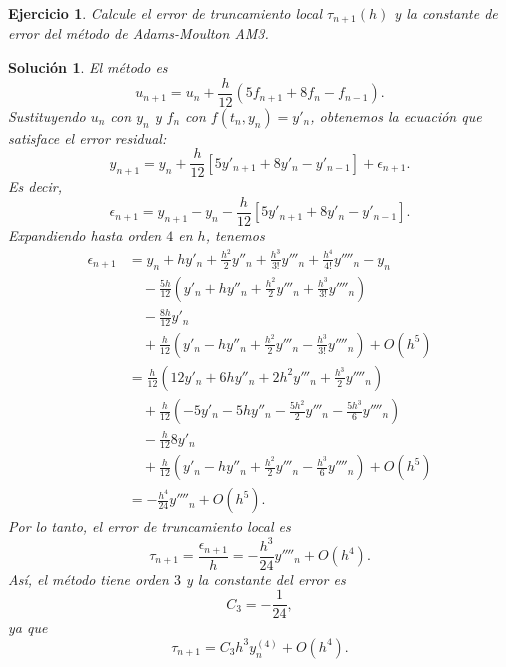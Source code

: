 \documentclass[11pt]{article}
\newtheorem{exercise}{Ejercicio}
\newtheorem*{sol}{Solución}
\begin{document}
\begin{exercise}
  Calcule el error de truncamiento local $\tau_{n+1}(h)$ y la
  constante de error del método de Adams-Moulton AM3.
\end{exercise}
\begin{sol}
  El método es
  \begin{equation}
    u_{n+1} = u_n + \frac{h}{12}(5f_{n+1}+8f_n-f_{n-1})
  .\end{equation}
  Sustituyendo $u_n$ con $y_n$ y $f_n$ con $f(t_n,y_n)=y'_n$,
  obtenemos la ecuación que satisface el error residual:
  \begin{equation}
    y_{n+1}
    = y_n
    + \frac{h}{12}[5y'_{n+1}+8y'_n-y'_{n-1}]
    + \epsilon_{n+1}
  .\end{equation}
  Es decir,
  \begin{equation}
    \epsilon_{n+1}
    = y_{n+1}
    - y_n
    - \frac{h}{12}[5y'_{n+1}+8y'_n-y'_{n-1}]
  .\end{equation}
  Expandiendo hasta orden $4$ en $h$, tenemos
  \begin{align}
    \epsilon_{n+1}
    &= y_n + hy'_n
      + \frac{h^{2}}{2}y''_n
      + \frac{h^{3}}{3!}y'''_n
      + \frac{h^{4}}{4!} y''''_n
      - y_n
    \\
    &\quad
      - \frac{5h}{12}
      \left(
        y'_{n}+hy''_n
        + \frac{h^{2}}{2}y'''_n
        + \frac{h^{3}}{3!}y''''_n
      \right) \\
    &\quad - \frac{8h}{12}y'_n \\
    &\quad
      + \frac{h}{12}
      \left(
        y'_{n}
        - hy''_n
        + \frac{h^{2}}{2}y'''_n
        - \frac{h^{3}}{3!}y''''_n
      \right)
      + O(h^{5})
    \\
    &= \frac{h}{12}
      \left(
        12y'_n
        + 6hy''_n
        + 2h^{2}y'''_n
        + \frac{h^{3}}{2} y''''_n
      \right)
    \\
    &\quad
      + \frac{h}{12}
      \left(
        - 5y'_{n}
        - 5hy''_n
        - \frac{5h^{2}}{2}y'''_n
        - \frac{5h^{3}}{6}y''''_n
      \right) \\
    &\quad
      - \frac{h}{12}8y'_n \\
    &\quad
      + \frac{h}{12}
      \left(
        y'_{n}
        - hy''_n
        + \frac{h^{2}}{2}y'''_n
        - \frac{h^{3}}{6}y''''_n
      \right)
    + O(h^{5})
    \\
    &= -\frac{h^{4}}{24}
      y''''_n
    + O(h^{5})
  .\end{align}
  Por lo tanto, el error de truncamiento local es
  \begin{equation}
    \tau_{n+1} = \frac{\epsilon_{n+1}}{h}
    = -\frac{h^{3}}{24}
      y''''_n
    + O(h^{4})
  .\end{equation}
  Así, el método tiene orden $3$ y la constante del error es
  \begin{equation}
    C_3 = -\frac{1}{24}
  ,\end{equation}
  ya que
  \begin{equation}
    \tau_{n+1} = C_3h^{3} y^{(4)}_n + O(h^{4})
  .\end{equation}
\end{sol}
\end{document}

